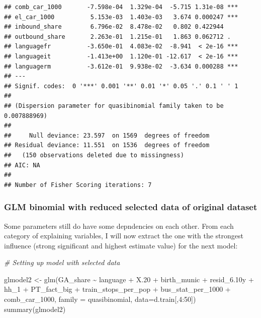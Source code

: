 \documentclass[
]{article}
\newenvironment{Shaded}{\begin{snugshade}}{\end{snugshade}}
\newcommand{\AttributeTok}[1]{\textcolor[rgb]{0.77,0.63,0.00}{#1}}
\newcommand{\CommentTok}[1]{\textcolor[rgb]{0.56,0.35,0.01}{\textit{#1}}}
\newcommand{\DecValTok}[1]{\textcolor[rgb]{0.00,0.00,0.81}{#1}}
\newcommand{\FloatTok}[1]{\textcolor[rgb]{0.00,0.00,0.81}{#1}}
\newcommand{\FunctionTok}[1]{\textcolor[rgb]{0.00,0.00,0.00}{#1}}
\newcommand{\NormalTok}[1]{#1}
\newcommand{\OtherTok}[1]{\textcolor[rgb]{0.56,0.35,0.01}{#1}}
\newcommand{\SpecialCharTok}[1]{\textcolor[rgb]{0.00,0.00,0.00}{#1}}
\begin{document}
\begin{verbatim}
## comb_car_1000       -7.598e-04  1.329e-04  -5.715 1.31e-08 ***
## el_car_1000          5.153e-03  1.403e-03   3.674 0.000247 ***
## inbound_share        6.796e-02  8.478e-02   0.802 0.422944    
## outbound_share       2.263e-01  1.215e-01   1.863 0.062712 .  
## languagefr          -3.650e-01  4.083e-02  -8.941  < 2e-16 ***
## languageit          -1.413e+00  1.120e-01 -12.617  < 2e-16 ***
## languagerm          -3.612e-01  9.938e-02  -3.634 0.000288 ***
## ---
## Signif. codes:  0 '***' 0.001 '**' 0.01 '*' 0.05 '.' 0.1 ' ' 1
## 
## (Dispersion parameter for quasibinomial family taken to be 0.007888969)
## 
##     Null deviance: 23.597  on 1569  degrees of freedom
## Residual deviance: 11.551  on 1536  degrees of freedom
##   (150 observations deleted due to missingness)
## AIC: NA
## 
## Number of Fisher Scoring iterations: 7
\end{verbatim}

\hypertarget{glm-binomial-with-reduced-selected-data-of-original-dataset}{%
\subsubsection{GLM binomial with reduced selected data of original
dataset}\label{glm-binomial-with-reduced-selected-data-of-original-dataset}}

Some parameters still do have some depndencies on each other. From each
category of explaining variables, I will now extract the one with the
strongest influence (strong significant and highest estimate value) for
the next model:

\begin{Shaded}
\begin{Highlighting}[]
\CommentTok{\# Setting up model with selected data}

\NormalTok{glmodel2 }\OtherTok{\textless{}{-}} \FunctionTok{glm}\NormalTok{(GA\_share }\SpecialCharTok{\textasciitilde{}}\NormalTok{ language }\SpecialCharTok{+}\NormalTok{ X}\FloatTok{.20} \SpecialCharTok{+}\NormalTok{ birth\_munic }\SpecialCharTok{+} 
\NormalTok{                  resid\_6}\FloatTok{.10}\NormalTok{y }\SpecialCharTok{+}\NormalTok{ hh\_1 }\SpecialCharTok{+}\NormalTok{ PT\_fact\_big }\SpecialCharTok{+}\NormalTok{ train\_stops\_per\_pop }\SpecialCharTok{+}\NormalTok{ bus\_stat\_per\_1000 }\SpecialCharTok{+} 
\NormalTok{      comb\_car\_1000, }\AttributeTok{family =}\NormalTok{ quasibinomial, }\AttributeTok{data=}\NormalTok{d.train[,}\DecValTok{4}\SpecialCharTok{:}\DecValTok{50}\NormalTok{])}
\FunctionTok{summary}\NormalTok{(glmodel2)}
\end{Highlighting}
\end{Shaded}
\end{document}
